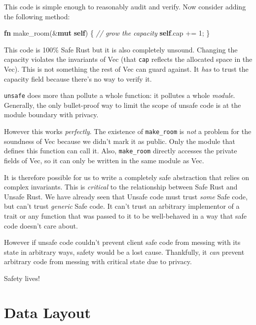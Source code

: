 \documentclass[a4paper,]{book}
\newenvironment{Shaded}{\begin{snugshade}}{\end{snugshade}}
\newcommand{\KeywordTok}[1]{\textcolor[rgb]{0.13,0.29,0.53}{\textbf{{#1}}}}
\newcommand{\DecValTok}[1]{\textcolor[rgb]{0.00,0.00,0.81}{{#1}}}
\newcommand{\CommentTok}[1]{\textcolor[rgb]{0.56,0.35,0.01}{\textit{{#1}}}}
\newcommand{\NormalTok}[1]{{#1}}
\begin{document}
This code is simple enough to reasonably audit and verify. Now consider
adding the following method:

\begin{Shaded}
\begin{Highlighting}[]
\KeywordTok{fn} \NormalTok{make_room(&}\KeywordTok{mut} \KeywordTok{self}\NormalTok{) \{}
    \CommentTok{// grow the capacity}
    \KeywordTok{self}\NormalTok{.cap += }\DecValTok{1}\NormalTok{;}
\NormalTok{\}}
\end{Highlighting}
\end{Shaded}

This code is 100\% Safe Rust but it is also completely unsound. Changing
the capacity violates the invariants of Vec (that \texttt{cap} reflects
the allocated space in the Vec). This is not something the rest of Vec
can guard against. It \emph{has} to trust the capacity field because
there's no way to verify it.

\texttt{unsafe} does more than pollute a whole function: it pollutes a
whole \emph{module}. Generally, the only bullet-proof way to limit the
scope of unsafe code is at the module boundary with privacy.

However this works \emph{perfectly}. The existence of
\texttt{make\_room} is \emph{not} a problem for the soundness of Vec
because we didn't mark it as public. Only the module that defines this
function can call it. Also, \texttt{make\_room} directly accesses the
private fields of Vec, so it can only be written in the same module as
Vec.

It is therefore possible for us to write a completely safe abstraction
that relies on complex invariants. This is \emph{critical} to the
relationship between Safe Rust and Unsafe Rust. We have already seen
that Unsafe code must trust \emph{some} Safe code, but can't trust
\emph{generic} Safe code. It can't trust an arbitrary implementor of a
trait or any function that was passed to it to be well-behaved in a way
that safe code doesn't care about.

However if unsafe code couldn't prevent client safe code from messing
with its state in arbitrary ways, safety would be a lost cause.
Thankfully, it \emph{can} prevent arbitrary code from messing with
critical state due to privacy.

Safety lives!

\chapter{Data Layout}\label{sec--data}
\end{document}
